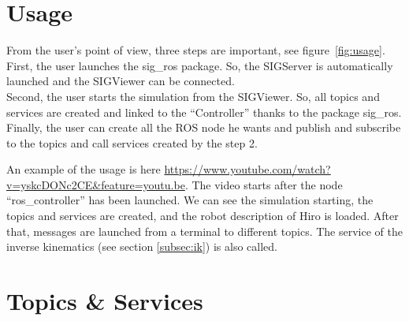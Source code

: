 \section{Usage}
From the user's point of view, three steps are important, see figure~\ref{fig:usage}.\\
First, the user launches the sig\_ros package. So, the SIGServer is automatically launched and the SIGViewer can be connected.\\
Second, the user starts the simulation from the SIGViewer. So, all topics and services are created and linked to the ``Controller'' thanks to the package sig\_ros.\\
Finally, the user can create all the ROS node he wants and publish and subscribe to the topics and call services created by the step 2.

\noindent\begin{minipage}{\linewidth}%
\label{fig:usage}%
\end{minipage}

An example of the usage is here \url{https://www.youtube.com/watch?v=yskcDONc2CE&feature=youtu.be}. The video starts after the node ``ros\_controller'' has been launched. We can see the simulation starting, the topics and services are created, and the robot description of Hiro is loaded. After that, messages are launched from a terminal to different topics. The service of the inverse kinematics (see section \ref{subsec:ik}) is also called.

\section{Topics \& Services}
